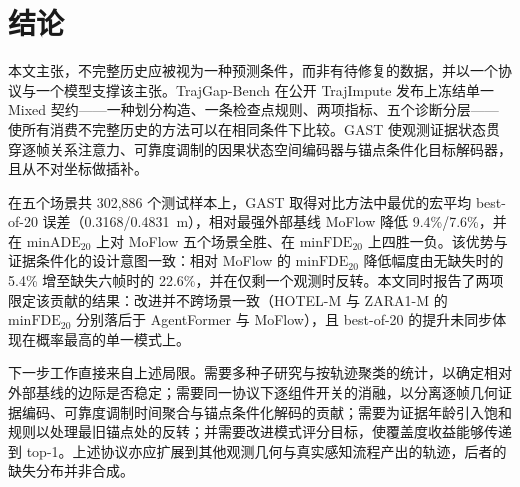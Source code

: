 \section{结论}
\label{sec:concl}

本文主张，不完整历史应被视为一种预测条件，而非有待修复的数据，并以一个协议与一个模型支撑该主张。TrajGap-Bench 在公开 TrajImpute 发布上冻结单一 Mixed 契约——一种划分构造、一条检查点规则、两项指标、五个诊断分层——使所有消费不完整历史的方法可以在相同条件下比较。GAST 使观测证据状态贯穿逐帧关系注意力、可靠度调制的因果状态空间编码器与锚点条件化目标解码器，且从不对坐标做插补。

在五个场景共 302{,}886 个测试样本上，GAST 取得对比方法中最优的宏平均 best-of-20 误差（0.3168/0.4831~m），相对最强外部基线 MoFlow 降低 9.4\%/7.6\%，并在 $\mathrm{minADE}_{20}$ 上对 MoFlow 五个场景全胜、在 $\mathrm{minFDE}_{20}$ 上四胜一负。该优势与证据条件化的设计意图一致：相对 MoFlow 的 $\mathrm{minFDE}_{20}$ 降低幅度由无缺失时的 5.4\% 增至缺失六帧时的 22.6\%，并在仅剩一个观测时反转。本文同时报告了两项限定该贡献的结果：改进并不跨场景一致（HOTEL-M 与 ZARA1-M 的 $\mathrm{minFDE}_{20}$ 分别落后于 AgentFormer 与 MoFlow），且 best-of-20 的提升未同步体现在概率最高的单一模式上。

下一步工作直接来自上述局限。需要多种子研究与按轨迹聚类的统计，以确定相对外部基线的边际是否稳定；需要同一协议下逐组件开关的消融，以分离逐帧几何证据编码、可靠度调制时间聚合与锚点条件化解码的贡献；需要为证据年龄引入饱和规则以处理最旧锚点处的反转；并需要改进模式评分目标，使覆盖度收益能够传递到 top-1。上述协议亦应扩展到其他观测几何与真实感知流程产出的轨迹，后者的缺失分布并非合成。
